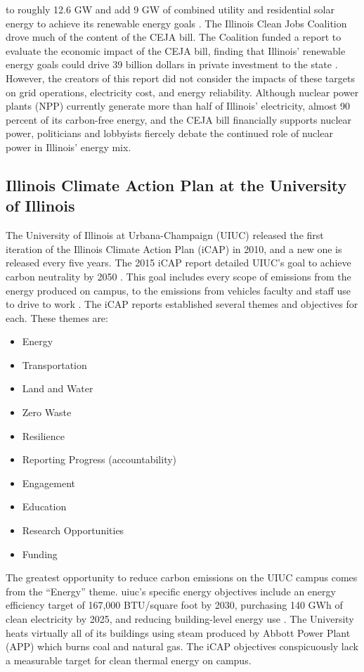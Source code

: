 to roughly 12.6 GW and add 9 GW of combined utility and residential solar energy
to achieve its renewable energy goals \cite{goeller_new_2021, the_accelerate_group_clean_2019}.
The Illinois Clean Jobs Coalition
drove much of the content of the CEJA bill. The Coalition funded a report to
evaluate the economic impact of the CEJA bill, finding that Illinois’ renewable
energy goals could drive 39 billion dollars in private investment to the state
\cite{the_accelerate_group_clean_2019}.
However, the creators of this report did not consider the impacts of these targets
on grid operations, electricity cost, and energy reliability. Although nuclear power
plants (NPP) currently generate more than half of Illinois’ electricity, almost
90 percent of its carbon-free energy, and the CEJA bill financially supports nuclear
power, politicians and lobbyists fiercely debate the continued role of nuclear power
in Illinois’ energy mix.

\subsection{Illinois Climate Action Plan at the University of Illinois}

The University of Illinois at Urbana-Champaign (UIUC) released the first iteration
of the Illinois Climate Action Plan (iCAP) in 2010, and a new one is released every five years.
The 2015 iCAP report detailed UIUC’s goal to achieve carbon neutrality by 2050
\cite{institute_for_sustainability_energy_and_environment_illinois_2015}.
This goal includes every scope of emissions from the energy produced on campus, to
the emissions from vehicles faculty and staff use to drive to work
\cite{institute_for_sustainability_energy_and_environment_illinois_2015,
institute_for_sustainability_energy_and_environment_illinois_2020}. The
iCAP reports established several themes and objectives for each. These themes are:
\begin{itemize}
  \item Energy
  \item Transportation
  \item Land and Water
  \item Zero Waste
  \item Resilience
  \item Reporting Progress (accountability)
  \item Engagement
  \item Education
  \item Research Opportunities
  \item Funding
\end{itemize}
The greatest opportunity to reduce carbon emissions on the UIUC campus comes from
the ``Energy” theme. \gls{uiuc}’s specific energy objectives include an energy
efficiency target of 167,000 BTU/square foot by 2030, purchasing 140 GWh of clean
electricity by 2025, and reducing building-level energy use
\cite{institute_for_sustainability_energy_and_environment_illinois_2020}. The University
heats virtually all of its buildings using steam produced by Abbott Power Plant
(APP) which burns coal and natural gas. The iCAP objectives conspicuously lack a
measurable target for clean thermal energy on campus.

